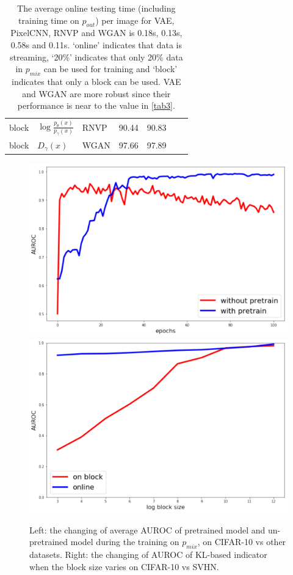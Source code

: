 \documentclass[letterpaper]{article} %
\newcommand{\pout}{p_{out}}
\newcommand{\pmix}{p_{mix}}
\begin{document}
\begin{table}[htbp]
\begin{tabular}{lllllll}
block & $\log \frac{p_\theta(x)}{p_\gamma(x)}$ & RNVP & 90.44 & 90.83 \\
block & $D_\gamma(x)$ & WGAN & 97.66 & 97.89 \\
\bottomrule
\end{tabular}
\caption{The average online testing time (including training time on $\pout$) per image for VAE, PixelCNN, RNVP and WGAN is 0.18s, 0.13s, 0.58s and 0.11s. `online' indicates that data is streaming, `20\%' indicates that only 20\% data in $\pmix$ can be used for training and `block' indicates that only a block can be used. VAE and WGAN are more robust since their performance is near to the value in \cref{tab3}. }
\label{tab4}
\end{table}

\begin{figure}[t]
\centering
\includegraphics[width=0.45\columnwidth]{auroc_during_training}
\includegraphics[width=0.45\columnwidth]{auroc_during_batch}
\caption{Left: the changing of average AUROC of pretrained model and un-pretrained model during the training on $\pmix$, on CIFAR-10 vs other datasets. Right: the changing of AUROC of KL-based indicator when the block size varies on CIFAR-10 vs SVHN. }
\label{fig6}
\end{figure}
\end{document}
